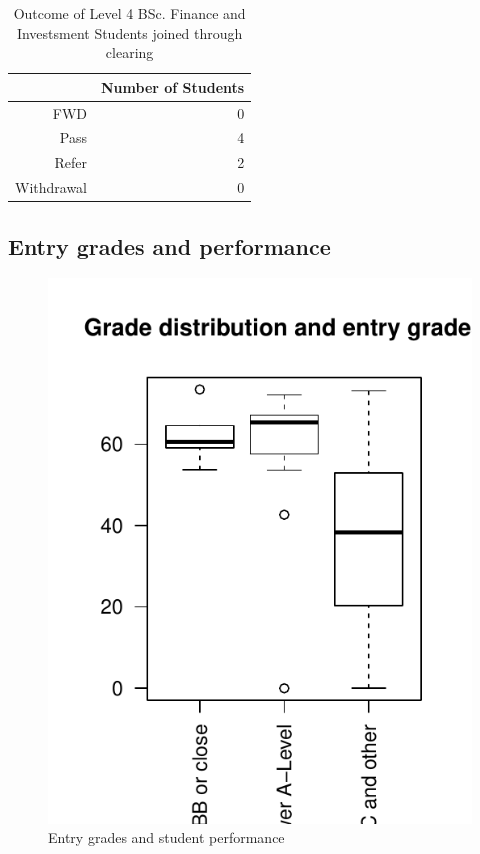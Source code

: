 \documentclass[12pt, a4paper, oneside]{article}\usepackage[]{graphicx}\usepackage[]{color}
\makeatletter
\def\maxwidth{ %
  \ifdim\Gin@nat@width>\linewidth
    \linewidth
  \else
    \Gin@nat@width
  \fi
}
\newenvironment{knitrout}{}{} %
\makeatother
\begin{document}
\begin{table}[ht]
\centering
\begin{tabular}{rr}
  \hline
 & Number of Students \\ 
  \hline
FWD &   0 \\ 
  Pass &   4 \\ 
  Refer &   2 \\ 
  Withdrawal &   0 \\ 
   \hline
\end{tabular}
\caption{Outcome of Level 4 BSc. Finance and Investsment Students joined through clearing} 
\label{tabref:out2}
\end{table}


\subsection*{Entry grades and performance}
\begin{knitrout}
\color{fgcolor}\begin{figure}[!h]

\includegraphics[width=\maxwidth]{figure/boxplot2} \caption[Entry grades and student performance]{Entry grades and student performance\label{fig:boxplot2}}
\end{figure}


\end{knitrout}
\end{document}
